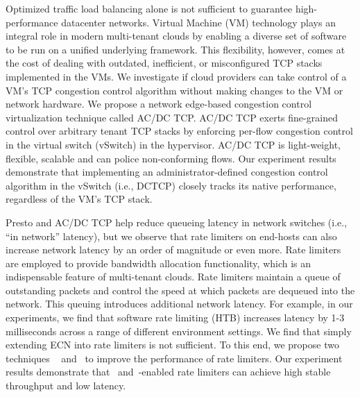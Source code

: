 Optimized traffic load balancing alone is not sufficient to 
guarantee high-performance datacenter networks. 
Virtual Machine (VM) technology plays an integral role in
modern multi-tenant clouds by enabling a diverse set of software to be run
on a unified underlying framework. This flexibility, however,
comes at the cost of dealing with outdated, inefficient,
or misconfigured TCP stacks implemented in the VMs. We investigate if cloud providers can take control of a VM's
TCP congestion control algorithm without making changes
to the VM or network hardware. We propose a network edge-based 
 congestion control virtualization technique called AC/DC TCP.
AC/DC TCP exerts fine-grained control over arbitrary tenant
TCP stacks by enforcing per-flow congestion control in
the virtual switch (vSwitch) in the hypervisor. AC/DC TCP is light-weight,
flexible, scalable and can police non-conforming flows. Our experiment results demonstrate that 
implementing an administrator-defined congestion control algorithm in the
vSwitch (i.e., DCTCP) closely tracks its native performance,
regardless of the VM's TCP stack.

Presto and AC/DC TCP help reduce queueing latency in 
network switches (i.e., ``in network'' latency), but we observe that 
rate limiters on end-hosts can also increase network latency by an order of magnitude or even more. 
Rate limiters are employed to provide bandwidth allocation functionality, 
which is an indispensable feature of multi-tenant clouds. Rate limiters
maintain a queue of outstanding packets and control the speed at which
packets are dequeued into the network. This queuing introduces
additional network latency. For example, in our experiments, we find
that software rate limiting (HTB) increases latency by 1-3 milliseconds
across a range of different environment settings. 
We find that simply extending ECN into rate limiters is not sufficient. 
To this end, we propose two techniques \textemdash\xspace~\dem{} and~\spring{} to 
improve the performance of rate limiters.
Our experiment results demonstrate that~\dem{} and~\spring{}-enabled
rate limiters can achieve high stable throughput and low latency.





